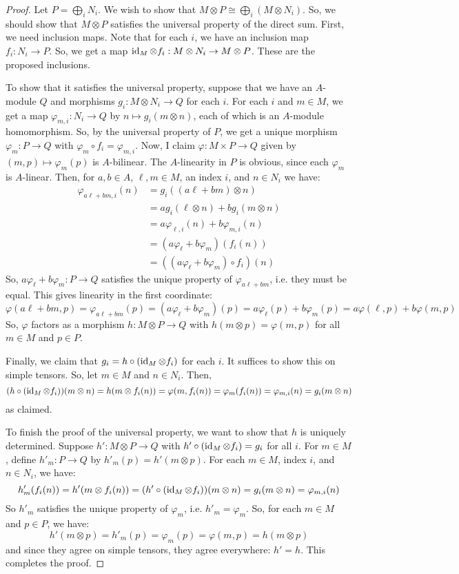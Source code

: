 \documentclass[12pt]{exam}
\begin{document}
\begin{proof}
	Let $P = \bigoplus_i N_i$. We wish to show that $M \otimes P \cong \bigoplus_i (M \otimes N_i)$. So, we should show that $M \otimes P$ satisfies the universal property of the direct sum. First, we need inclusion maps. Note that for each $i$, we have an inclusion map $f_i : N_i \to P$. So, we get a map $\operatorname{id}_M \otimes f_i : M \otimes N_i \to M \otimes P$. These are the proposed inclusions.
	
	To show that it satisfies the universal property, suppose that we have an $A$-module $Q$ and morphisms $g_i : M \otimes N_i \to Q$ for each $i$. For each $i$ and $m \in M$, we get a map $\varphi_{m,i} : N_i \to Q$ by $n \mapsto g_i(m \otimes n)$, each of which is an $A$-module homomorphism. So, by the universal property of $P$, we get a unique morphism $\varphi_m : P \to Q$ with $\varphi_m \circ f_i = \varphi_{m,i}$. Now, I claim $\varphi : M \times P \to Q$ given by $(m,p) \mapsto \varphi_m(p)$ is $A$-bilinear. The $A$-linearity in $P$ is obvious, since each $\varphi_m$ is $A$-linear. Then, for $a,b \in A$, $\ell,m \in M$, an index $i$, and $n \in N_i$ we have:
	\begin{align*}
	\varphi_{a\ell+bm,i}(n)
		&= g_i((a\ell+bm) \otimes n) \\
		&= ag_i(\ell \otimes n)+bg_i(m \otimes n) \\
		&= a\varphi_{\ell,i}(n)+b\varphi_{m,i}(n) \\
		&= (a\varphi_\ell+b\varphi_m)(f_i(n)) \\
		&= ((a\varphi_\ell+b\varphi_m) \circ f_i)(n)
	\end{align*}
	So, $a\varphi_\ell+b\varphi_m : P \to Q$ satisfies the unique property of $\varphi_{a\ell+bm}$, i.e. they must be equal. This gives linearity in the first coordinate:
	\[ \varphi(a\ell+bm,p) = \varphi_{a\ell+bm}(p) = (a\varphi_\ell+b\varphi_m)(p) = a\varphi_\ell(p)+b\varphi_m(p) = a\varphi(\ell,p)+b\varphi(m,p) \]
	So, $\varphi$ factors as a morphism $h : M \otimes P \to Q$ with $h(m \otimes p) = \varphi(m,p)$ for all $m \in M$ and $p \in P$.
	
	Finally, we claim that $g_i = h \circ (\operatorname{id}_M \otimes f_i)$ for each $i$. It suffices to show this on simple tensors. So, let $m \in M$ and $n \in N_i$. Then,
	\[ (h \circ (\operatorname{id}_M \otimes f_i))(m \otimes n) = h(m \otimes f_i(n)) = \varphi(m, f_i(n)) = \varphi_m(f_i(n)) = \varphi_{m,i}(n) = g_i(m \otimes n) \]
	as claimed.
	
	To finish the proof of the universal property, we want to show that $h$ is uniquely determined. Suppose $h' : M \otimes P \to Q$ with $h' \circ (\operatorname{id}_M \otimes f_i) = g_i$ for all $i$. For $m \in M$, define $h'_m : P \to Q$ by $h'_m(p) = h'(m \otimes p)$. For each $m \in M$, index $i$, and $n \in N_i$, we have:
	\[ h'_m(f_i(n)) = h'(m \otimes f_i(n)) = (h' \circ (\operatorname{id}_M \otimes f_i))(m \otimes n) = g_i(m \otimes n) = \varphi_{m,i}(n) \]
	So $h'_m$ satisfies the unique property of $\varphi_m$, i.e. $h'_m = \varphi_m$. So, for each $m \in M$ and $p \in P$, we have:
	\[ h'(m \otimes p) = h'_m(p) = \varphi_m(p) = \varphi(m,p) = h(m \otimes p) \]
	and since they agree on simple tensors, they agree everywhere: $h' = h$. This completes the proof.
\end{proof}
\end{document}
